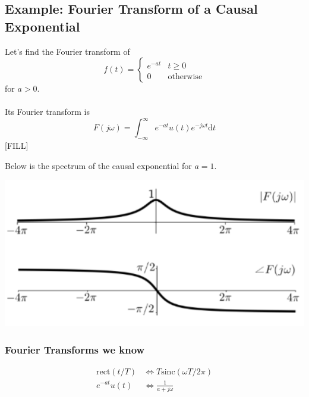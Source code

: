 \documentclass[10pt]{article}
\newcommand{\sinc}{\text{sinc}}
\begin{document}
\subsection*{Example: Fourier Transform of a Causal Exponential}
Let's find the Fourier transform of
\[f(t) = \begin{cases}e^{-at} & t \geq 0 \\ 0 & \text{otherwise}\end{cases}\]
for $a > 0$.\\\\
Its Fourier transform is 
\[F(j\omega) = \int_{-\infty}^\infty e^{-at} u(t) e^{-j\omega t} \text{d}t\]
[FILL]

Below is the spectrum of the causal exponential for $a = 1$.
\begin{center}
    \includegraphics[scale=0.8]{W5_3.png}
\end{center}

\subsubsection*{Fourier Transforms we know}
\begin{align*}
    \text{rect}(t/T) &\Longleftrightarrow T \sinc(\omega T / 2\pi)\\
    e^{-at} u(t) &\Longleftrightarrow \frac{1}{a + j\omega}
\end{align*}
\end{document}
